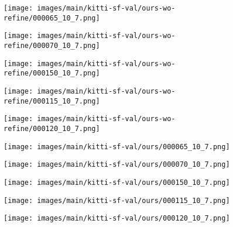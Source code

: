 \documentclass[10pt,twocolumn,letterpaper]{article}
\begin{document}
\begin{figure*}
    \begin{subfigure}[b]{0.02\linewidth}
        \centering
    \end{subfigure}\hfill
    \begin{subfigure}[b]{0.19\linewidth}
        \texttt{[image: images/main/kitti-sf-val/ours-wo-refine/000065\_10\_7.png]}
    \end{subfigure}\hfill
    \begin{subfigure}[b]{0.19\linewidth}
        \texttt{[image: images/main/kitti-sf-val/ours-wo-refine/000070\_10\_7.png]}
    \end{subfigure}\hfill
    \begin{subfigure}[b]{0.19\linewidth}
        \texttt{[image: images/main/kitti-sf-val/ours-wo-refine/000150\_10\_7.png]}
    \end{subfigure}\hfill
    \begin{subfigure}[b]{0.19\linewidth}
        \texttt{[image: images/main/kitti-sf-val/ours-wo-refine/000115\_10\_7.png]}
    \end{subfigure}\hfill
    \begin{subfigure}[b]{0.19\linewidth}
        \texttt{[image: images/main/kitti-sf-val/ours-wo-refine/000120\_10\_7.png]}
    \end{subfigure}\hfill
    \begin{subfigure}[b]{0.02\linewidth}
        \hspace{10pt}
    \end{subfigure}\hfill

    \begin{subfigure}[b]{0.02\linewidth}
        \centering
    \end{subfigure}\hfill
    \begin{subfigure}[b]{0.19\linewidth}
        \texttt{[image: images/main/kitti-sf-val/ours/000065\_10\_7.png]}
    \end{subfigure}\hfill
    \begin{subfigure}[b]{0.19\linewidth}
        \texttt{[image: images/main/kitti-sf-val/ours/000070\_10\_7.png]}
    \end{subfigure}\hfill
    \begin{subfigure}[b]{0.19\linewidth}
        \texttt{[image: images/main/kitti-sf-val/ours/000150\_10\_7.png]}
    \end{subfigure}\hfill
    \begin{subfigure}[b]{0.19\linewidth}
        \texttt{[image: images/main/kitti-sf-val/ours/000115\_10\_7.png]}
    \end{subfigure}\hfill
    \begin{subfigure}[b]{0.19\linewidth}
        \texttt{[image: images/main/kitti-sf-val/ours/000120\_10\_7.png]}
    \end{subfigure}\hfill
    \begin{subfigure}[b]{0.02\linewidth}
        \hspace{10pt}
    \end{subfigure}\hfill


\end{figure*}
\end{document}
